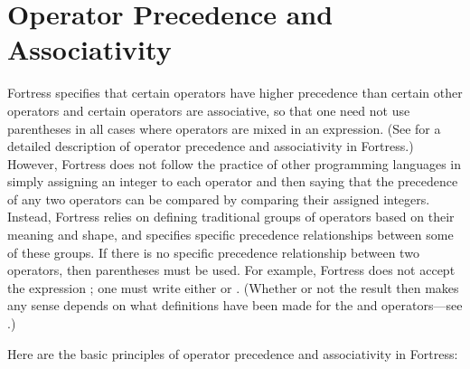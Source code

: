 %
%
%
%

\section{Operator Precedence and Associativity}

Fortress specifies that certain operators have higher precedence than
certain other operators and certain operators are associative,
so that one need not use parentheses in all
cases where operators are mixed in an expression.  (See
 for a detailed description of operator
precedence and associativity in Fortress.)  However, Fortress
does not follow the practice of other programming languages in
simply assigning an integer to each operator and then saying that
the precedence of any two operators can be compared by comparing
their assigned integers.  Instead, Fortress relies on defining traditional
groups of operators based on their meaning and shape, and specifies
specific precedence relationships between some of these groups.
If there is no specific precedence relationship between two
operators, then parentheses must be used.  For example, Fortress
does not accept the expression ;
one must write either  or .
(Whether or not the result then makes any sense depends on what definitions
have been made for the \EXP{+} and \EXP{\cup} operators---see
.)

Here are the basic principles of operator precedence and associativity
in Fortress:

